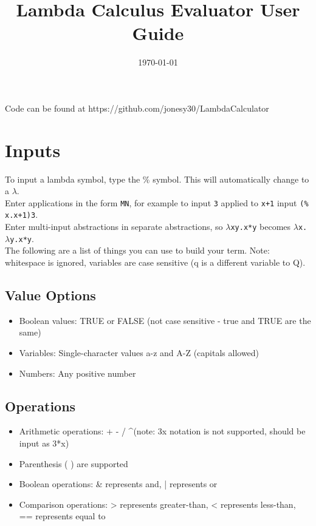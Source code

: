 \documentclass[a4paper,11pt]{article}
\begin{document}
	
\title{Lambda Calculus Evaluator User Guide}
\date{\today}
\newpage

\maketitle
\Large{Code can be found at https://github.com/jonesy30/LambdaCalculator}
\section{Inputs}
To input a lambda symbol, type the \% symbol. This will automatically change to a $\lambda$.\\

Enter applications in the form \texttt{MN}, for example to input \texttt{3} applied to \texttt{x+1} input \texttt{(\% x.x+1)3}.\\

Enter multi-input abstractions in separate abstractions, so \texttt{$\lambda$xy.x*y} becomes \texttt{$\lambda$x.$\lambda$y.x*y}.\\

The following are a list of things you can use to build your term. Note: whitespace is ignored, variables are case sensitive (q is a different variable to Q).

\subsection{Value Options}
\begin{itemize}
	\item Boolean values: TRUE or FALSE (not case sensitive - true and TRUE are the same)
	\item Variables: Single-character values a-z and A-Z (capitals allowed)
	\item Numbers: Any positive number
\end{itemize} 

\subsection{Operations}
\begin{itemize}
	\item Arithmetic operations: + - / \^
	\subitem(note: 3x notation is not supported, should be input as 3*x)
	\item Parenthesis ( ) are supported
	\item Boolean operations: \& represents and, | represents or
	\item Comparison operations: > represents greater-than, < represents less-than, == represents equal to 
\end{itemize}
\end{document}
